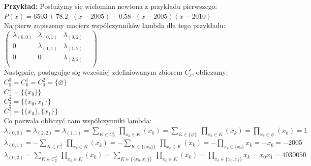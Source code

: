 \documentclass[a4paper,12pt]{article}
\newcommand{\id}{\noindent}
\newcommand{\el}[2]{\lambda_{(#1, #2)}}
\newcommand{\bl}[1]{\textbf{#1}}
\begin{document}
\id
\bl{Przykład:} Posłużymy się wielomian newtona z przykładu pierwszego: \\

$P(x)=6503+78.2\cdot(x-2005)-0.58\cdot(x-2005)(x-2010)$ \\

\id
Najpierw zapiszemy macierz współczynników lambda dla tego przykładu: \\

$
\begin{pmatrix}
\el{0}{0} & \el{0}{1} & \el{0}{2} \\
0 & \el{1}{1} & \el{1}{2} \\
0 & 0 & \el{2}{2} &\\
\end{pmatrix}
$ \\

\id
Następnie, posługując się wcześniej zdefiniowanym zbiorem $C_j^i$, obliczamy: \\

$C^0_0 = C^1_0 = C^2_0 = \{ \varnothing \}$ \\

$C^1_1 = \{ \{x_0\} \}$ \\

$C^2_2 = \{ \{x_0, x_1 \} \}$ \\

$C^2_1 = \{ \{x_0\}, \{ x_1 \} \}$ \\

\id
Co pozwala obliczyć nam współczynniki lambda: \\

$\el{0}{0} = \el{2}{2} = \el{1}{1} = \sum\limits_{K \in C^1_{0}} \ \prod\limits_{x_k \in K} \left( x_k \right) = \sum\limits_{K \in \{ \varnothing \}} \ \prod\limits_{x_k \in K} \left( x_k \right) = \prod\limits_{x_k \in \varnothing} \left( x_k \right) = 1$ \\


$\el{0}{1} = -\sum\limits_{K \in C^1_{1}} \ \prod\limits_{x_k \in K} \left( x_k \right) =  -\sum\limits_{K \in \{ \{x_0\} \}} \ \prod\limits_{x_k \in K} \left( x_k \right) = -\prod\limits_{x_k \in \{x_0\}}x_k = -x_0 = -2005$ \\


$\el{0}{2} = \sum\limits_{K \in C^2_{2}} \ \prod\limits_{x_k \in K} \left( x_k \right) =  \sum\limits_{K \in \{ \{x_0, x_1\} \}} \ \prod\limits_{x_k \in K} \left( x_k \right) = \prod\limits_{x_k \in \{x_0, x_1\}}x_k = x_0x_1 = 4030050$ \\
\end{document}

